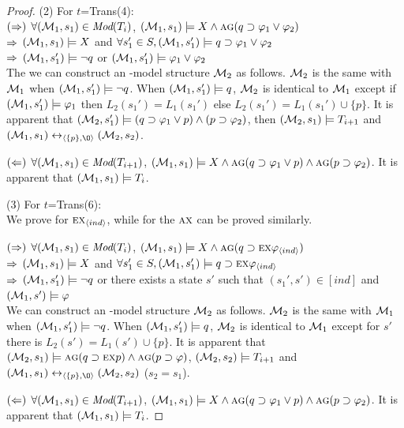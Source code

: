 \documentclass{article}
\begin{document}
\begin{proof}
(2) For $t$=Trans(4):\\
 $(\Rightarrow)$ $\forall ({\cal M}_1,s_1) \in \textit{Mod}(T_i)$, \ie $({\cal M}_1,s_1) \models X \wedge \textsc{a}\textsc{g} (q \supset \varphi_1 \vee \varphi_2)$ \\
 $\Rightarrow$ $({\cal M}_1,s_1) \models X$ and $\forall s_1'\in S, ({\cal M}_1,s_1') \models q \supset \varphi_1 \vee \varphi_2$\\
 $\Rightarrow$ $({\cal M}_1,s_1') \models \neg q$ or $({\cal M}_1,s_1') \models \varphi_1 \vee \varphi_2$\\
 The we can construct an \Ind-model structure ${\cal M}_2$ as follows. ${\cal M}_2$ is the same with ${\cal M}_1$ when $({\cal M}_1,s_1') \models \neg q$. When $({\cal M}_1,s_1') \models q$, ${\cal M}_2$ is identical to ${\cal M}_1$ except if $({\cal M}_1,s_1') \models \varphi_1$ then $L_2(s_1')= L_1(s_1')$ else $L_2(s_1') = L_1(s_1') \cup \{p\}$. It is apparent that $({\cal M}_2,s_1') \models (q\supset \varphi_1 \vee p) \wedge (p \supset \varphi_2)$, then $({\cal M}_2,s_1) \models T_{i+1}$ and $(\Hm_1, s_1) \lrto_{\tuple{\{p\}, {\O}}} (\Hm_2, s_2)$.

 $(\Leftarrow)$ $\forall ({\cal M}_1, s_1) \in \textit{Mod}(T_{i+1})$, \ie $({\cal M}_1,s_1) \models X \wedge \textsc{a}\textsc{g} (q\supset \varphi_1 \vee p) \wedge \textsc{a}\textsc{g}(p \supset \varphi_2)$. It is apparent that $({\cal M}_1, s_1) \models T_i$.


(3) For $t$=Trans(6):\\
We prove for $\textsc{e} \textsc{x}_{{\langle{ind}\rangle}}$, while for the $\textsc{a} \textsc{x}$ can be proved similarly.

 $(\Rightarrow)$ $\forall ({\cal M}_1,s_1) \in \textit{Mod}(T_i)$, \ie $({\cal M}_1,s_1) \models X \wedge \textsc{a}\textsc{g}(q \supset \textsc{e}\textsc{x} \varphi_{{\langle{ind}\rangle}})$\\
 $\Rightarrow$ $({\cal M}_1,s_1) \models X$ and $\forall s_1'\in S, ({\cal M}_1,s_1') \models q \supset \textsc{e} \textsc{x} \varphi_{{\langle{ind}\rangle}}$\\
 $\Rightarrow$ $({\cal M}_1,s_1') \models \neg q$ or there exists a state $s'$ such that $(s_1', s') \in [ind]$ and $({\cal M}_1,s') \models \varphi$ \\
 We can construct an \Ind-model structure ${\cal M}_2$ as follows. ${\cal M}_2$ is the same with ${\cal M}_1$ when $({\cal M}_1,s_1') \models \neg q$. When $({\cal M}_1,s_1') \models q$, ${\cal M}_2$ is identical to ${\cal M}_1$ except for $s'$ there is $L_2(s') = L_1(s') \cup \{p\}$. It is apparent that $({\cal M}_2,s_1) \models \textsc{a}\textsc{g}(q\supset \textsc{e} \textsc{x} p) \wedge \textsc{a}\textsc{g}(p \supset \varphi)$, $({\cal M}_2,s_2) \models T_{i+1}$ and $(\Hm_1, s_1) \lrto_{\tuple{\{p\}, {\O}}} (\Hm_2, s_2)$ ($s_2=s_1$).

  $(\Leftarrow)$ $\forall ({\cal M}_1, s_1) \in \textit{Mod}(T_{i+1})$, \ie $({\cal M}_1,s_1) \models X \wedge \textsc{a}\textsc{g}(q\supset \varphi_1 \vee p) \wedge \textsc{a}\textsc{g}(p \supset \varphi_2)$. It is apparent that $({\cal M}_1, s_1) \models T_i$.
\end{proof}
\end{document}
